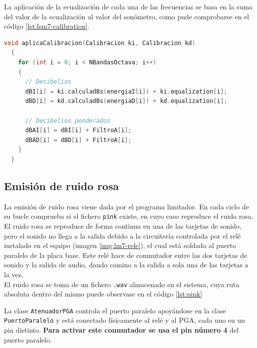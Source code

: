 
La aplicación de la ecualización de cada una de las frecuencias se basa en la suma del valor de la ecualización al valor del sonómetro, como pude comprobarse en el código \ref{lst:lsm7-calibration}. \\

\begin{lstlisting}[language=c++, label={lst:lsm7-calibration}, caption={Calculo de decibelios y aplicación de la ecualización.}]
  void aplicaCalibracion(Calibracion ki, Calibracion kd)
  {
    for (int i = 0; i < NBandasOctava; i++)
    {
      // Decibelios
      dBI[i] = ki.calculadBs(energiaI[i]) + ki.equalization[i];
      dBD[i] = kd.calculadBs(energiaD[i]) + kd.equalization[i];

	  // Decibelios ponderados
      dBAI[i] = dBI[i] + FiltroA[i];
      dBAD[i] = dBD[i] + FiltroA[i];
    }
  }
\end{lstlisting}

\subsection{Emisión de ruido rosa} \label{sec:lms7-pink}

La emisión de ruido rosa viene dada por el programa limitador. En cada ciclo de su bucle comprueba si el fichero \verb|pink| existe, en cuyo caso reproduce el ruido rosa. El ruido rosa se reproduce de forma continua en una de las tarjetas de sonido, pero el sonido no llega a la salida debido a la circuitería controlada por el relé instalado en el equipo (imagen \ref{img:lm7-rele}), el cual está soldado al puerto paralelo de la placa base. Este relé hace de conmutador entre las dos tarjetas de sonido y la salida de audio, dando camino a la salida a sola una de las tarjetas a la vez. \\
El ruido rosa se toma de un fichero \verb|.wav| almacenado en el sistema, cuya ruta absoluta dentro del mismo puede observase en el código \ref{lst:pink}

La clase \verb|AtenuadorPGA| controla el puerto paralelo apoyándose en la clase \verb|PuertoParalelo| y está conectado físicamente al relé y al PGA, cada uno en un pin distinto. \textbf{Para activar este conmutador se usa el pin número 4} del puerto paralelo.

